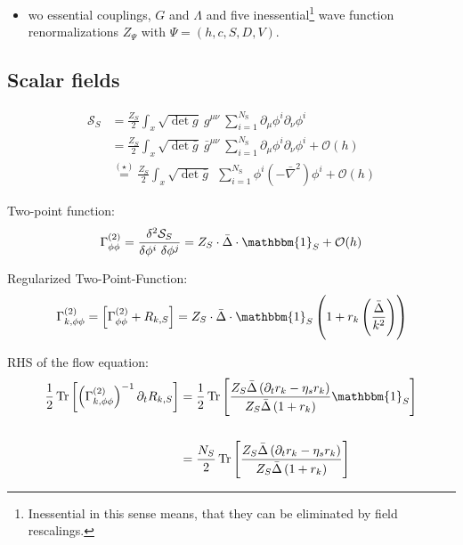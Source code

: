 \begin{itemize}
	\item wo essential couplings, $G$ and $\Lambda$ and five inessential\footnote{Inessential in this sense means, that they can be eliminated by field rescalings.} wave function renormalizations $Z_{\Psi}$ with $\Psi = (h,c,S,D,V)$.
\end{itemize}
\subsection{Scalar fields}
\begin{align}
	\mathcal{S}_S &= \frac{Z_{S}}{2}\int_x \sqrt{\operatorname{det}g} \ g^{\mu\nu} \ \sum\limits_{i=1}^{N_{\text{S}}} \partial_{\mu}\phi^{i}\partial_{\nu}\phi^{i} \nonumber \\
&=  \frac{Z_{S}}{2}\int_x \sqrt{\operatorname{det}\bar{g}} \ \bar{g}^{\mu\nu} \ \sum\limits_{i=1}^{N_{\text{S}}} \partial_{\mu}\phi^{i}\partial_{\nu}\phi^{i} + \mathcal{O}(h) \\
&\overset{(\star)}{=} \frac{Z_{S}}{2}\int_x \sqrt{\operatorname{det}\bar{g}} \ \ \sum\limits_{i=1}^{N_{\text{S}}} \phi^{i}\left(-\bar{\nabla}^2\right)\phi^{i} + \mathcal{O}(h) \nonumber
\end{align}

Two-point function:
\begin{align}
	\Gamma^{(2)}_{\phi\phi} = \frac{\delta^2 \mathcal{S}_S}{\delta\phi^{i}\ \delta\phi^{j}} = Z_S \cdot\bar{\Delta}\cdot\mathbbm{1}_S + \mathcal{O}(h)  
\end{align}

Regularized Two-Point-Function:
\begin{align}
	\Gamma^{(2)}_{k, \phi\phi} = \left[\Gamma^{(2)}_{\phi\phi}+ R_{k, S}\right]  = Z_S \cdot\bar{\Delta}\cdot\mathbbm{1}_S\left(1 + r_k\left(\frac{\bar{\Delta}}{k^2}\right)\right) 
\end{align}



RHS of the flow equation:
\begin{align}
	\frac{1}{2}\tr{\left(\Gamma^{(2)}_{k, \phi\phi}\right)^{-1}\partial_t R_{k,S}} &= \frac{1}{2}\tr{\frac{Z_S\bar{\Delta}\left(\partial_t r_k - \eta_s r_k\right)}{Z_S \bar{\Delta}\left(1 + r_k\right)}\mathbbm{1}_S} \nonumber\\
	\phantom{.} \\
	&=   \frac{N_S}{2}\tr{\frac{Z_S\bar{\Delta}\left(\partial_t r_k - \eta_s r_k\right)}{Z_S \bar{\Delta}\left(1 + r_k\right)}} \nonumber
\end{align}

